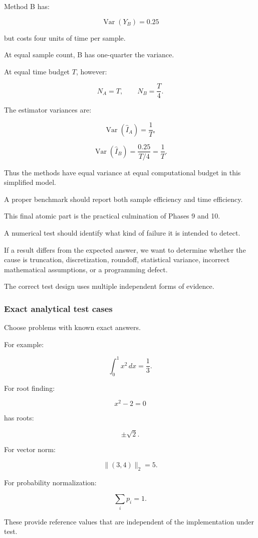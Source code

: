 Method B has:

\[ \operatorname{Var}(Y_B)=0.25 \]

but costs four units of time per sample.

At equal sample count, B has one-quarter the variance.

At equal time budget \(T\), however:

\[ N_A=T, \qquad N_B=\frac T4. \]

The estimator variances are:

\[ \operatorname{Var}(\hat I_A)=\frac1T, \]

\[ \operatorname{Var}(\hat I_B) = \frac{0.25}{T/4} =\frac1T. \]

Thus the methods have equal variance at equal computational budget in this simplified model.

A proper benchmark should report both sample efficiency and time efficiency.

This final atomic part is the practical culmination of Phases 9 and 10.

A numerical test should identify what kind of failure it is intended to detect.

If a result differs from the expected answer, we want to determine whether the cause is truncation, discretization, roundoff, statistical variance, incorrect mathematical assumptions, or a programming defect.

The correct test design uses multiple independent forms of evidence.

\subsubsection{Exact analytical test cases}\label{02-foundations-ii-ch031-exact-analytical-test-cases}

Choose problems with known exact answers.

For example:

\[ \int_0^1x^2\,dx=\frac13. \]

For root finding:

\[ x^2-2=0 \]

has roots:

\[ \pm\sqrt2. \]

For vector norm:

\[ \|(3,4)\|_2=5. \]

For probability normalization:

\[ \sum_ip_i=1. \]

These provide reference values that are independent of the implementation under test.

